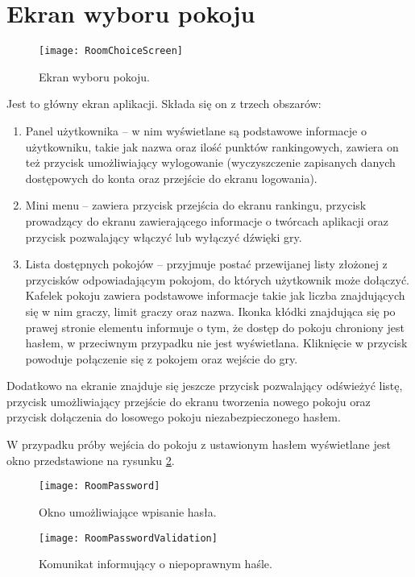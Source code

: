 \section{Ekran wyboru pokoju}
\begin{figure}[htbp]
\centering
\texttt{[image: RoomChoiceScreen]}
\caption{Ekran wyboru pokoju.}
\label{fig:roomchoicescreen}
\end{figure}

Jest to główny ekran aplikacji. Składa się on z trzech obszarów:
\begin{enumerate}
    \item Panel użytkownika – w nim wyświetlane są podstawowe informacje o użytkowniku, takie jak nazwa oraz ilość punktów rankingowych, zawiera on też przycisk umożliwiający wylogowanie (wyczyszczenie zapisanych danych dostępowych do konta oraz przejście do ekranu logowania). 
    \item Mini menu – zawiera przycisk przejścia do ekranu rankingu, przycisk prowadzący do ekranu zawierającego informacje o twórcach aplikacji oraz przycisk pozwalający włączyć lub wyłączyć dźwięki gry.
    \item Lista dostępnych pokojów – przyjmuje postać przewijanej listy złożonej z przycisków odpowiadającym pokojom, do których użytkownik może dołączyć. Kafelek pokoju zawiera podstawowe informacje takie jak liczba znajdujących się w nim graczy, limit graczy oraz nazwa. Ikonka kłódki znajdująca się po prawej stronie elementu informuje o tym, że dostęp do pokoju chroniony jest hasłem, w przeciwnym przypadku nie jest wyświetlana. Kliknięcie w przycisk powoduje połączenie się z pokojem oraz wejście do gry.
\end{enumerate}

Dodatkowo na ekranie znajduje się jeszcze przycisk pozwalający odświeżyć listę, przycisk umożliwiający przejście do ekranu tworzenia nowego pokoju oraz przycisk dołączenia do losowego pokoju niezabezpieczonego hasłem.

W przypadku próby wejścia do pokoju z ustawionym hasłem wyświetlane jest okno przedstawione na rysunku \ref{fig:roompassword}.

\begin{figure}[htbp]
\centering
\texttt{[image: RoomPassword]}
\caption{Okno umożliwiające wpisanie hasła.}
\label{fig:roompassword}
\end{figure}

\begin{figure}[htbp]
\centering
\texttt{[image: RoomPasswordValidation]}
\caption{Komunikat informujący o niepoprawnym haśle.}
\label{fig:roompasswordvalidation}
\end{figure}

